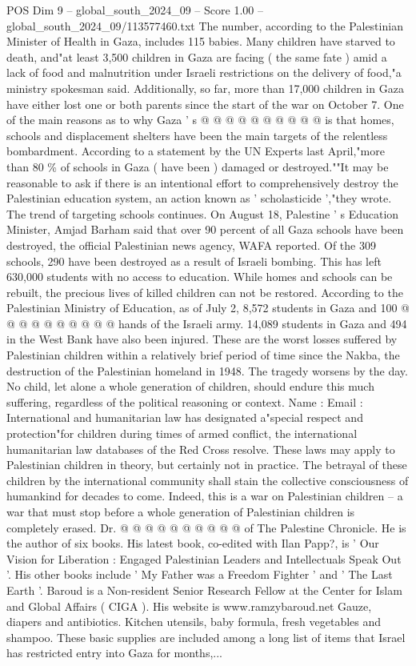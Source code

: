 \begin{textsample}{POS Dim 9 – global\_south\_2024\_09 – Score 1.00 – global\_south\_2024\_09/113577460.txt}
The number, according to the Palestinian Minister of Health in Gaza, includes 115 babies.
Many children have starved to death, and"at least 3,500 children in Gaza are facing ( the same fate ) amid a lack of food and malnutrition under Israeli restrictions on the delivery of food,"a ministry spokesman said.
Additionally, so far, more than 17,000 children in Gaza have either lost one or both parents since the start of the war on October 7.
One of the main reasons as to why Gaza ' s @ @ @ @ @ @ @ @ @ @ is that homes, schools and displacement shelters have been the main targets of the relentless bombardment.
According to a statement by the UN Experts last April,"more than 80 \% of schools in Gaza ( have been ) damaged or destroyed.""It may be reasonable to ask if there is an intentional effort to comprehensively destroy the Palestinian education system, an action known as ' scholasticide ',"they wrote.
The trend of targeting schools continues.
On August 18, Palestine ' s Education Minister, Amjad Barham said that over 90 percent of all Gaza schools have been destroyed, the official Palestinian news agency, WAFA reported.
Of the 309 schools, 290 have been destroyed as a result of Israeli bombing.
This has left 630,000 students with no access to education.
While homes and schools can be rebuilt, the precious lives of killed children can not be restored.
According to the Palestinian Ministry of Education, as of July 2, 8,572 students in Gaza and 100 @ @ @ @ @ @ @ @ @ @ hands of the Israeli army. 14,089 students in Gaza and 494 in the West Bank have also been injured.
These are the worst losses suffered by Palestinian children within a relatively brief period of time since the Nakba, the destruction of the Palestinian homeland in 1948.
The tragedy worsens by the day.
No child, let alone a whole generation of children, should endure this much suffering, regardless of the political reasoning or context.
Name : Email : International and humanitarian law has designated a"special respect and protection"for children during times of armed conflict, the international humanitarian law databases of the Red Cross resolve.
These laws may apply to Palestinian children in theory, but certainly not in practice.
The betrayal of these children by the international community shall stain the collective consciousness of humankind for decades to come.
Indeed, this is a war on Palestinian children -- a war that must stop before a whole generation of Palestinian children is completely erased.
Dr. @ @ @ @ @ @ @ @ @ @ of The Palestine Chronicle.
He is the author of six books.
His latest book, co-edited with Ilan Papp?, is ' Our Vision for Liberation : Engaged Palestinian Leaders and Intellectuals Speak Out '.
His other books include ' My Father was a Freedom Fighter ' and ' The Last Earth '.
Baroud is a Non-resident Senior Research Fellow at the Center for Islam and Global Affairs ( CIGA ).
His website is www.ramzybaroud.net Gauze, diapers and antibiotics.
Kitchen utensils, baby formula, fresh vegetables and shampoo.
These basic supplies are included among a long list of items that Israel has restricted entry into Gaza for months,...

\end{textsample}
